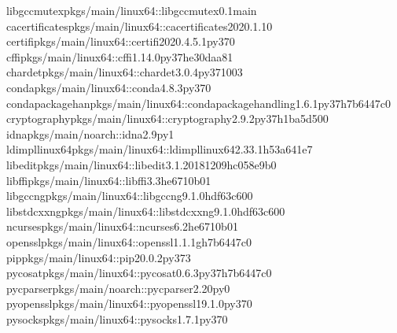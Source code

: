 \documentclass[a4paper,11pt,english]{sphinxmanual}
\begin{document}
\begin{sphinxVerbatim}[commandchars=\\\{\}]
\PYGZus{}libgcc\PYGZus{}mutexpkgs/main/linux\PYGZhy{}64::\PYGZus{}libgcc\PYGZus{}mutex\PYGZhy{}0.1\PYGZhy{}main
ca\PYGZhy{}certificatespkgs/main/linux\PYGZhy{}64::ca\PYGZhy{}certificates\PYGZhy{}2020.1.1\PYGZhy{}0
certifipkgs/main/linux\PYGZhy{}64::certifi\PYGZhy{}2020.4.5.1\PYGZhy{}py37\PYGZus{}0
cffipkgs/main/linux\PYGZhy{}64::cffi\PYGZhy{}1.14.0\PYGZhy{}py37he30daa8\PYGZus{}1
chardetpkgs/main/linux\PYGZhy{}64::chardet\PYGZhy{}3.0.4\PYGZhy{}py37\PYGZus{}1003
condapkgs/main/linux\PYGZhy{}64::conda\PYGZhy{}4.8.3\PYGZhy{}py37\PYGZus{}0
conda\PYGZhy{}package\PYGZhy{}han\PYGZti{}pkgs/main/linux\PYGZhy{}64::conda\PYGZhy{}package\PYGZhy{}handling\PYGZhy{}1.6.1\PYGZhy{}py37h7b6447c\PYGZus{}0
cryptographypkgs/main/linux\PYGZhy{}64::cryptography\PYGZhy{}2.9.2\PYGZhy{}py37h1ba5d50\PYGZus{}0
idnapkgs/main/noarch::idna\PYGZhy{}2.9\PYGZhy{}py\PYGZus{}1
ld\PYGZus{}impl\PYGZus{}linux\PYGZhy{}64pkgs/main/linux\PYGZhy{}64::ld\PYGZus{}impl\PYGZus{}linux\PYGZhy{}64\PYGZhy{}2.33.1\PYGZhy{}h53a641e\PYGZus{}7
libeditpkgs/main/linux\PYGZhy{}64::libedit\PYGZhy{}3.1.20181209\PYGZhy{}hc058e9b\PYGZus{}0
libffipkgs/main/linux\PYGZhy{}64::libffi\PYGZhy{}3.3\PYGZhy{}he6710b0\PYGZus{}1
libgcc\PYGZhy{}ngpkgs/main/linux\PYGZhy{}64::libgcc\PYGZhy{}ng\PYGZhy{}9.1.0\PYGZhy{}hdf63c60\PYGZus{}0
libstdcxx\PYGZhy{}ngpkgs/main/linux\PYGZhy{}64::libstdcxx\PYGZhy{}ng\PYGZhy{}9.1.0\PYGZhy{}hdf63c60\PYGZus{}0
ncursespkgs/main/linux\PYGZhy{}64::ncurses\PYGZhy{}6.2\PYGZhy{}he6710b0\PYGZus{}1
opensslpkgs/main/linux\PYGZhy{}64::openssl\PYGZhy{}1.1.1g\PYGZhy{}h7b6447c\PYGZus{}0
pippkgs/main/linux\PYGZhy{}64::pip\PYGZhy{}20.0.2\PYGZhy{}py37\PYGZus{}3
pycosatpkgs/main/linux\PYGZhy{}64::pycosat\PYGZhy{}0.6.3\PYGZhy{}py37h7b6447c\PYGZus{}0
pycparserpkgs/main/noarch::pycparser\PYGZhy{}2.20\PYGZhy{}py\PYGZus{}0
pyopensslpkgs/main/linux\PYGZhy{}64::pyopenssl\PYGZhy{}19.1.0\PYGZhy{}py37\PYGZus{}0
pysockspkgs/main/linux\PYGZhy{}64::pysocks\PYGZhy{}1.7.1\PYGZhy{}py37\PYGZus{}0

\end{sphinxVerbatim}
\end{document}
